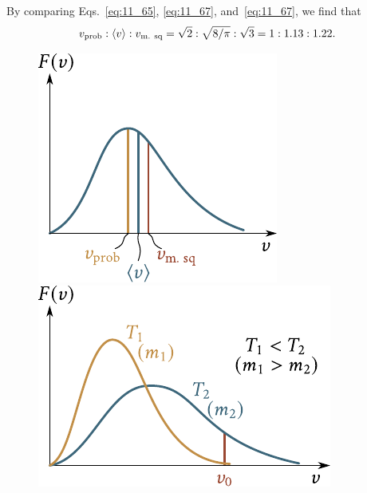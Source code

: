 By comparing Eqs.~\eqref{eq:11_65}, \eqref{eq:11_67}, and~\eqref{eq:11_67}, we find that
\begin{equation*}
	v_{\text{prob}}:\left\langle v \right\rangle:v_{\text{m. sq}} = \sqrt{2}:\sqrt{8/\pi}:\sqrt{3} = 1 : 1.13 : 1.22.
\end{equation*}

\begin{figure}[t]
	\begin{minipage}[t]{0.5\linewidth}
		\begin{center}
			\includegraphics[scale=0.98]{figures/ch_11/fig_11_18.pdf}
			\caption[]{}
			\label{fig:11_18}
		\end{center}
	\end{minipage}
	\hspace{-0.05cm}
	\begin{minipage}[t]{0.5\linewidth}
		\begin{center}
			\includegraphics[scale=0.98]{figures/ch_11/fig_11_19.pdf}
			\caption[]{}
			\label{fig:11_19}
		\end{center}
	\end{minipage}
	\vspace{-0.4cm}
\end{figure}

